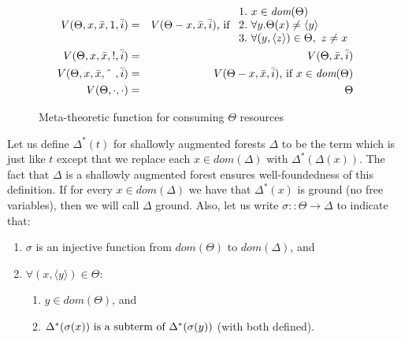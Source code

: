 \documentclass[9pt,natbib]{sigplanconf}
\begin{document}
\begin{figure}
\begin{eqnarray*}
V(\Theta,x,\bar{x},1,\bar{i}) & = & V(\Theta - x ,\bar{x},\bar{i})\textnormal{, if }
\begin{array}{l}
1.\  x\in\textit{dom}(\Theta) \\ 
2.\  \forall y. \Theta(x) \neq \langle y \rangle \\ 
3.\  \forall (y,\langle z \rangle)\in\Theta,\ z\neq x \\
\end{array} \\
V(\Theta,x,\bar{x},!,\bar{i}) & = & V(\Theta ,\bar{x},\bar{i}) \\
V(\Theta,x,\bar{x},\textnormal{\^{\ }},\bar{i}) & = & V(\Theta - x ,\bar{x},\bar{i})\textnormal{, if }x\in\textit{dom}(\Theta)\\
V(\Theta,\cdot,\cdot) & = & \Theta
\end{eqnarray*}
\caption{Meta-theoretic function for consuming $\Theta$ resources}
\label{fig:consumea}
\end{figure}

 Let us define $\Delta^*(t)$ for shallowly augmented forests
$\Delta$ to be the term which is just like $t$ except that we replace
each $x\in\textit{dom}(\Delta)$ with $\Delta^*(\Delta(x))$.  The fact
that $\Delta$ is a shallowly augmented forest ensures well-foundedness
of this definition.  If for every $x\in\textit{dom}(\Delta)$ we have
that $\Delta^*(x)$ is ground (no free variables), then we will call
$\Delta$ ground.  Also, let us write $\sigma::\Theta\to\Delta$ to indicate
that:
\begin{enumerate}
\item $\sigma$ is an injective function from $\textit{dom}(\Theta)$ to $\textit{dom}(\Delta)$, and
\item $\forall (x,\langle y \rangle)\in\Theta$:
\begin{enumerate}
\item $y\in\textit{dom}(\Theta)$, and
\item $\Delta^*(\sigma(x))\textnormal{ is a subterm of }\Delta^*(\sigma(y))$ (with both defined).
\end{enumerate}
\end{enumerate}
\end{document}
